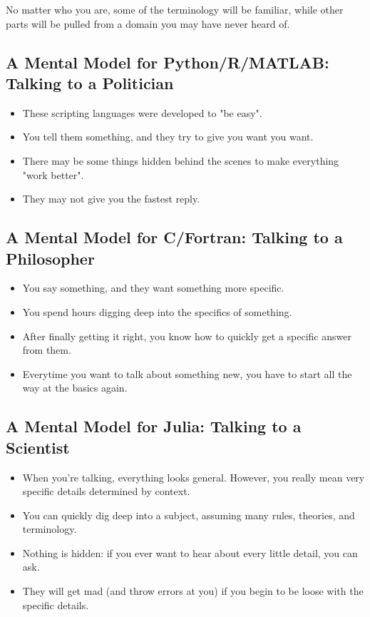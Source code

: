 \documentclass[11pt]{article}
\providecommand{\tightlist}{%
      \setlength{\itemsep}{0pt}\setlength{\parskip}{0pt}}
\begin{document}
No matter who you are, some of the terminology will be familiar, while
other parts will be pulled from a domain you may have never heard of.

    \subsection{A Mental Model for Python/R/MATLAB: Talking to a
Politician}\label{a-mental-model-for-pythonrmatlab-talking-to-a-politician}

\begin{itemize}
\tightlist
\item
  These scripting languages were developed to "be easy".
\item
  You tell them something, and they try to give you want you want.
\item
  There may be some things hidden behind the scenes to make everything
  "work better".
\item
  They may not give you the fastest reply.
\end{itemize}

    \subsection{A Mental Model for C/Fortran: Talking to a
Philosopher}\label{a-mental-model-for-cfortran-talking-to-a-philosopher}

\begin{itemize}
\tightlist
\item
  You say something, and they want something more specific.
\item
  You spend hours digging deep into the specifics of something.
\item
  After finally getting it right, you know how to quickly get a specific
  answer from them.
\item
  Everytime you want to talk about something new, you have to start all
  the way at the basics again.
\end{itemize}

    \subsection{A Mental Model for Julia: Talking to a
Scientist}\label{a-mental-model-for-julia-talking-to-a-scientist}

\begin{itemize}
\tightlist
\item
  When you're talking, everything looks general. However, you really
  mean very specific details determined by context.
\item
  You can quickly dig deep into a subject, assuming many rules,
  theories, and terminology.
\item
  Nothing is hidden: if you ever want to hear about every little detail,
  you can ask.
\item
  They will get mad (and throw errors at you) if you begin to be loose
  with the specific details.
\end{itemize}
\end{document}
